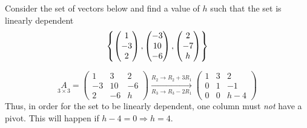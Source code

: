 \begin{example}{}{}
    Consider the set of vectors below and find a value of $h$ such that the set is linearly dependent 
    \[ 
        \left\{
            \begin{pmatrix}
                1 \\ -3 \\ 2
            \end{pmatrix}, 
            \begin{pmatrix}
                -3 \\ 10 \\ -6
            \end{pmatrix},
            \begin{pmatrix}
                2 \\ -7 \\ h
            \end{pmatrix}
         \right\}
    \]
    \begin{solution}
        \[
            \underset{3 \times 3}{A} =
            \begin{pmatrix}
                1 & 3 & 2  \\
                -3 & 10 & -6 \\
                2 & -6 & h
            \end{pmatrix} 
            \xrightarrow[R_3 \to R_3 - 2R_1]{R_2 \to R_2 + 3R_1}
            \begin{pmatrix}
                1 & 3 & 2  \\
                0 & 1 & -1 \\
                0 & 0 & h-4
            \end{pmatrix} 
        \]
        Thus, in order for the set to be linearly dependent, one column must \textit{not} have a pivot. This will happen if $h-4=0 \Rightarrow h = 4$. 
    \end{solution}
\end{example}


